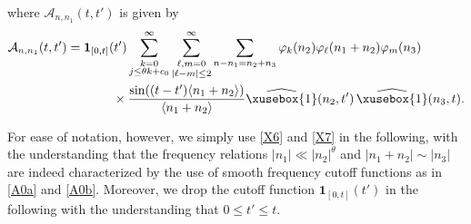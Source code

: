 \documentclass[%
11pt,  reqno]{amsart}
\def\<#1>{\xusebox{#1}}
\newcommand{\1}{\hspace{0.2mm}\text{I}\hspace{0.2mm}}
\newcommand{\noi}{\noindent}
\newcommand{\ft}{\widehat}
\newcommand{\ta}{\theta}
\renewcommand{\l}{\ell}
\newcommand{\jb}[1]
{\langle #1 \rangle}
\newcommand{\ind}{\mathbf 1}
\newcommand{\A}{\mathcal{A}}
\numberwithin{equation}{section}
\numberwithin{theorem}{section}
\begin{document}
\noi
where $\A_{n, n_1} (t, t')$ is given by 
\begin{align}
\begin{split}
\A_{n, n_1} (t, t')
& = \ind_{[0 , t]}(t')
\sum_{\substack{k = 0\\ j \leq \ta k + c_0}}^\infty
\sum_{\substack{\l, m = 0\\|\l-m|\leq 2}}^\infty
\sum_{n - n_1 =  n_2 + n_3} 
 \varphi_k(n_2)  
 \varphi_\l(n_1 + n_2) 
 \varphi_m(n_3) \\
& \hphantom{XXXX}
\times  \frac{\sin ((t - t') \jb{n_1 + n_2 })}{\jb{ n_1 + n_2 }} 
   \ft{\<1>}(n_2, t')\,   \ft{\<1>}(n_3, t)  .
\end{split}
\label{A0b}
\end{align}


\noi
For ease of notation, however, 
we simply use \eqref{X6} and \eqref{X7}
in the following, 
with the understanding that 
the frequency relations
$|n_1| \ll |n_2|^\theta$ and $ |n_1 + n_2|\sim |n_3|$
are indeed characterized by the use of smooth frequency cutoff functions
as in \eqref{A0a} and \eqref{A0b}.
Moreover, we drop the cutoff function $\ind_{[0 , t]}(t')$ in the following
with the understanding that $0 \leq t' \le t$.
\end{document}
